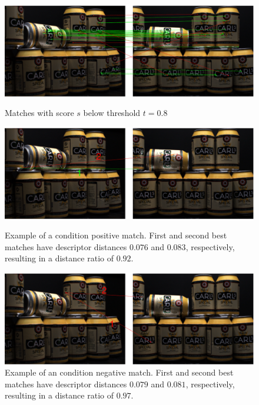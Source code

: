 \documentclass[thesis.tex]{subfiles}
\begin{document}
\begin{figure}[p]
	\centerline{\includegraphics[width=1.1\textwidth]{img/imageCorrespondenceMatches.pdf}}
	\caption{Matches with score $s$ below threshold $t = 0.8$}
	\label{fig:imageCorrespondenceMatches}
	\vspace{5mm}
	\centerline{\includegraphics[width=1.1\textwidth]{img/imageCorrespondenceCorrectMatch.pdf}}
	\caption{Example of a condition positive match. First and second best matches have descriptor distances $0.076$ and $0.083$, respectively, resulting in a distance ratio of $0.92$.}
	\label{fig:imageCorrespondenceCorrectMatch}
	\vspace{5mm}
	\centerline{\includegraphics[width=1.1\textwidth]{img/imageCorrespondenceIncorrectMatch.pdf}}
	\caption{Example of an condition negative match. First and second best matches have descriptor distances $0.079$ and $0.081$, respectively, resulting in a distance ratio of $0.97$.}
	\label{fig:imageCorrespondenceIncorrectMatch}
\end{figure}
\end{document}
